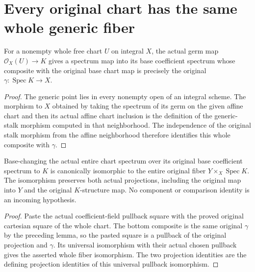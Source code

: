 \section{Every original chart has the same whole generic fiber}

\begin{lemma}
\label{lem:kn-structure-trace-chart-generic-base}
\leanok
For a nonempty whole free chart $U$ on integral $X$, the actual germ
map $\mathcal O_X(U)\to K$ gives a spectrum map into its base coefficient
spectrum whose composite with the original base chart map is precisely
the original $\gamma:\operatorname{Spec}K\to X$.
\end{lemma}
\begin{proof}
The generic point lies in every nonempty open of an integral scheme.
The morphism to $X$ obtained by taking the spectrum of its germ on the
given affine chart and then its actual affine chart inclusion is the
definition of the generic-stalk morphism computed in that neighborhood.
The independence of the original stalk morphism from the affine
neighborhood therefore identifies this whole composite with $\gamma$.
\end{proof}

\begin{lemma}
\label{lem:kn-structure-trace-chart-generic-iso}
\leanok
Base-changing the actual entire chart spectrum over its original base
coefficient spectrum to $K$ is canonically isomorphic to the entire
original fiber $Y\times_X\operatorname{Spec}K$. The isomorphism preserves
both actual projections, including the original map into $Y$ and the
original $K$-structure map. No component or comparison identity is an
incoming hypothesis.
\end{lemma}
\begin{proof}
Paste the actual coefficient-field pullback square with the proved
original cartesian square of the whole chart. The bottom composite is
the same original $\gamma$ by the preceding lemma, so the pasted square
is a pullback of the original projection and $\gamma$. Its universal
isomorphism with their actual chosen pullback gives the asserted whole
fiber isomorphism. The two projection identities are the defining
projection identities of this universal pullback isomorphism.
\end{proof}

